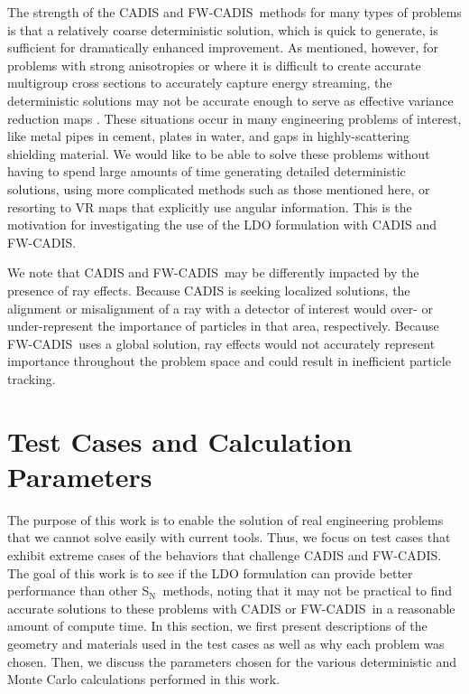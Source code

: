 \documentclass{article} %
\newcommand{\sn}{S$_\mathrm{N}$}
\newcommand{\fwc}{\mbox{FW-CADIS}}
\begin{document}
The strength of the CADIS and \fwc\ methods for many types of problems is that a
relatively coarse deterministic solution, which is quick to generate, is
sufficient for dramatically enhanced improvement. As mentioned, however, for
problems with strong anisotropies or where it is difficult to create accurate
multigroup cross sections to accurately capture energy streaming, the
deterministic solutions may not be accurate enough to serve as effective
variance reduction maps \cite{wilsonslaybaugh,peplow}. These situations occur in
many engineering problems of interest, like metal pipes in cement, plates in
water, and gaps in highly-scattering shielding material. We would like to be
able to solve these problems without having to spend large amounts of time
generating detailed deterministic solutions, using more complicated methods such
as those mentioned here, or resorting to VR maps that explicitly use angular
information. This is the motivation for investigating the use of the LDO
formulation with CADIS and \fwc.

We note that CADIS and \fwc\ may be differently impacted by the presence of
ray effects. Because CADIS is seeking localized solutions, the alignment or
misalignment of a ray with a detector of interest would over- or under-represent
the importance of particles in that area, respectively. Because \fwc\ uses a
global solution, ray effects would not accurately represent importance
throughout the problem space and could result in inefficient particle tracking.

\section{Test Cases and Calculation Parameters}

The purpose of this work is to enable the solution of real engineering problems
that we cannot solve easily with current tools. Thus, we focus on test cases
that exhibit extreme cases of the behaviors that challenge CADIS and \fwc. The
goal of this work is to see if the LDO formulation can provide better
performance than other \sn\ methods, noting that it may not be practical to find
accurate solutions to these problems with CADIS or \fwc\ in a reasonable amount
of compute time. In this section, we first present descriptions of the geometry
and materials used in the test cases as well as why each problem was chosen.
Then, we discuss the parameters chosen for the various deterministic and Monte
Carlo calculations performed in this work.
\end{document}
